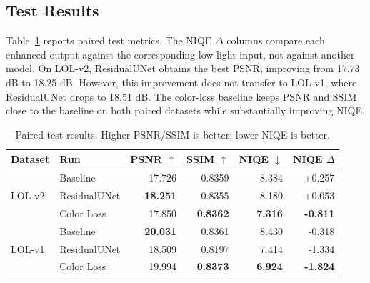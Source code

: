 \documentclass[10pt,twocolumn]{article}
\begin{document}
\subsection{Test Results}
Table~\ref{tab:paired_results} reports paired test metrics. The NIQE $\Delta$ columns compare each enhanced output against the corresponding low-light input, not against another model. On LOL-v2, ResidualUNet obtains the best PSNR, improving from 17.73 dB to 18.25 dB. However, this improvement does not transfer to LOL-v1, where ResidualUNet drops to 18.51 dB. The color-loss baseline keeps PSNR and SSIM close to the baseline on both paired datasets while substantially improving NIQE.

\begin{table}[!tbp]
\centering
\caption{Paired test results. Higher PSNR/SSIM is better; lower NIQE is better.}
\label{tab:paired_results}
\small
\setlength{\tabcolsep}{5pt}
\begin{tabular}{llrrrr}
\toprule
Dataset & Run & PSNR $\uparrow$ & SSIM $\uparrow$ & NIQE $\downarrow$ & NIQE $\Delta$ \\
\midrule
\multirow{3}{*}{LOL-v2}
& Baseline & 17.726 & 0.8359 & 8.384 & +0.257 \\
& ResidualUNet & \textbf{18.251} & 0.8355 & 8.180 & +0.053 \\
& Color Loss & 17.850 & \textbf{0.8362} & \textbf{7.316} & \textbf{-0.811} \\
\midrule
\multirow{3}{*}{LOL-v1}
& Baseline & \textbf{20.031} & 0.8361 & 8.430 & -0.318 \\
& ResidualUNet & 18.509 & 0.8197 & 7.414 & -1.334 \\
& Color Loss & 19.994 & \textbf{0.8373} & \textbf{6.924} & \textbf{-1.824} \\
\bottomrule
\end{tabular}
\end{table}

\begin{table}[!htbp]
\centering
\caption{ExDark unpaired evaluation. Lower is better.}
\label{tab:exdark}
\small
{}
\end{table}
\end{document}
